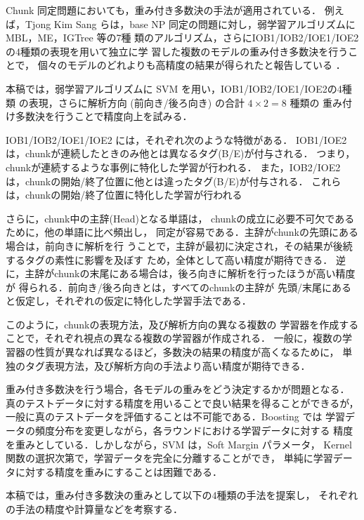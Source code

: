 Chunk 同定問題においても，重み付き多数決の手法が適用されている．
例えば，Tjong Kim Sang らは，base NP 同定の問題に対し，弱学習アルゴリズムに MBL，ME，IGTree 等の7種
類のアルゴリズム，さらにIOB1/IOB2/IOE1/IOE2の4種類の表現を用いて独立に学
習した複数のモデルの重み付き多数決を行うことで，
個々のモデルのどれよりも高精度の結果が得られたと報告している
\cite{Tjong_Kim_Sang2000a,Tjong_Kim_Sang2000b}．

本稿では，弱学習アルゴリズムに SVM を用い，IOB1/IOB2/IOE1/IOE2の4種類
の表現，さらに解析方向 (前向き/後ろ向き) の合計 $4 \times 2 = 8$ 種類の
重み付け多数決を行うことで精度向上を試みる．

IOB1/IOB2/IOE1/IOE2 には，それぞれ次のような特徴がある．
IOB1/IOE2 は，chunkが連続したときのみ他とは異なるタグ(B/E)が付与される．
つまり，chunkが連続するような事例に特化した学習が行われる．
また，IOB2/IOE2 は，chunkの開始/終了位置に他とは違ったタグ(B/E)が付与される．
これらは，chunkの開始/終了位置に特化した学習が行われる

さらに，chunk中の主辞(Head)となる単語は，
chunkの成立に必要不可欠であるために，他の単語に比べ頻出し，
同定が容易である．主辞がchunkの先頭にある場合は，前向きに解析を行	
うことで，主辞が最初に決定され，その結果が後続するタグの素性に影響を及ぼす
ため，全体として高い精度が期待できる．
逆に，主辞がchunkの末尾にある場合は，後ろ向きに解析を行ったほうが高い精度が
得られる．前向き/後ろ向きとは，すべてのchunkの主辞が
先頭/末尾にあると仮定し，それぞれの仮定に特化した学習手法である．

このように，chunkの表現方法，及び解析方向の異なる複数の
学習器を作成することで，それぞれ視点の異なる複数の学習器が作成される．
一般に，複数の学習器の性質が異なれば異なるほど，多数決の結果の精度が高くなるために，
単独のタグ表現方法，及び解析方向の手法より高い精度が期待できる．

重み付き多数決を行う場合，各モデルの重みをどう決定するかが問題となる．
真のテストデータに対する精度を用いることで良い結果を得ることができるが，
一般に真のテストデータを評価することは不可能である．Boosting では
学習データの頻度分布を変更しながら，各ラウンドにおける学習データに対する
精度を重みとしている．しかしながら，SVM は，Soft Margin パラメータ，
Kernel 関数の選択次第で，学習データを完全に分離することができ，
単純に学習データに対する精度を重みにすることは困難である．

本稿では，重み付き多数決の重みとして以下の4種類の手法を提案し，
それぞれの手法の精度や計算量などを考察する．


